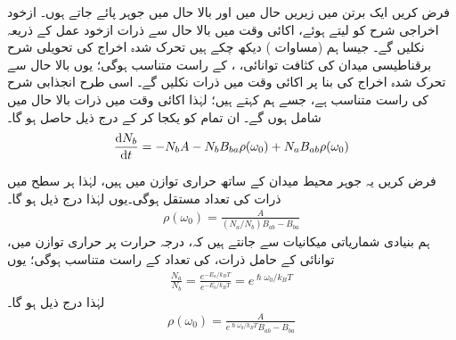 
فرض کریں ایک برتن میں زیریں حال  میں  اور بالا حال  میں  جوہر پائے جاتے ہوں۔ ازخود اخراجی شرح کو  لیتے ہوئے، اکائی وقت میں بالا حال سے  ذرات ازخود عمل کے ذریعہ نکلیں گے۔ جیسا ہم (مساوات ) دیکھ چکے ہیں تحرک شدہ اخراج کی تحویلی شرح برقناطیسی میدان کی کثافت توانائی، ، کے راست متناسب ہوگی؛ یوں بالا حال سے تحرک شدہ اخراج کی بنا پر اکائی وقت میں  ذرات نکلیں گے۔ اسی طرح انجذابی شرح  کی راست متناسب ہے، جسے ہم  کہتے ہیں؛ لہٰذا اکائی وقت میں  ذرات بالا حال میں شامل ہوں گے۔ ان تمام کو یکجا کر کے درج ذیل حاصل ہو گا۔
\begin{align}
	\frac{\dif N_b}{\dif t} = -N_bA-N_bB_{ba}\rho(\omega_0)+N_aB_{ab}\rho(\omega_0)
\end{align}

فرض کریں یہ جوہر محیط میدان کے ساتھ حراری توازن میں ہیں، لہٰذا ہر سطح میں ذرات کی تعداد مستقل ہوگی۔یوں  لہٰذا درج ذیل ہو گا۔
\begin{align}
	\rho(\omega_0) = \frac{A}{(N_a/N_b)B_{ab}-B_{ba}}
\end{align}
ہم بنیادی شماریاتی میکانیات سے جانتے ہیں کہ، درجہ حرارت  پر حراری توازن میں، توانائی  کے حامل ذرات، کی تعداد   کے راست متناسب ہوگی؛ یوں
\begin{align}
	\frac{N_a}{N_b} = \frac{e^{-E_a/k_{B}T}}{e^{-E_b/k_BT}} = e^{\hslash\omega_0/k_BT}
\end{align}
لہٰذا درج ذیل ہو گا۔
\begin{align}
	\rho(\omega_0) = \frac{A}{e^{\hslash\omega_0/k_BT}B_{ab}-B_{ba}}
\end{align}

